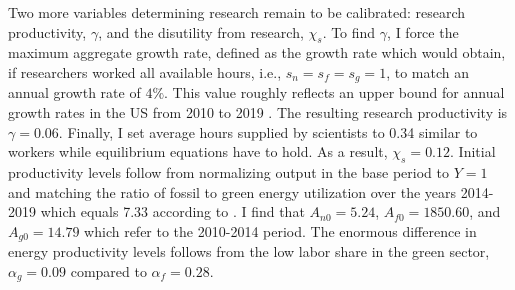  Two more variables determining research remain to be calibrated: research productivity, $\gamma$, and the disutility from research, $\chi_s$.
 To find $\gamma$, I force the maximum aggregate growth rate, defined as the growth rate which would obtain, if researchers worked all available hours, i.e., $s_n=s_f=s_g=1$, to match an annual growth rate of $4\%$. This value roughly reflects an upper bound for annual growth rates in the US from 2010 to 2019 \citep[compare][]{OECDGDP}.
  The resulting research productivity is $\gamma = 0.06$.  Finally, I set average hours supplied by scientists to 0.34 similar to workers while equilibrium equations have to hold. As a result,  $\chi_s=0.12$. Initial productivity levels follow from normalizing output in the base period to $Y=1$ and matching the ratio of fossil to green energy utilization over the years 2014-2019 which equals 7.33 according to \cite[][Table 1.3]{EIAEnergy}. I find that $A_{n0}=5.24$, $A_{f0}=1850.60$, and $A_{g0}=14.79$ which refer to the 2010-2014 period. The enormous difference in energy productivity levels follows from the low labor share in the green sector, $\alpha_g=0.09$ compared to $\alpha_f= 0.28$. 
 \thispagestyle{empty}

